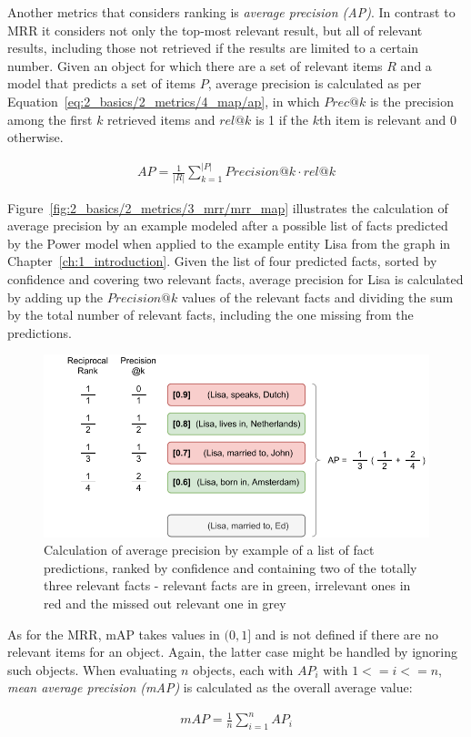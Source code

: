 Another metrics that considers ranking is \emph{average precision (AP)}. In contrast to MRR it considers not only the top-most relevant result, but all of relevant results, including those not retrieved if the results are limited to a certain number. Given an object for which there are a set of relevant items $R$ and a model that predicts a set of items $P$, average precision is calculated as per Equation~\ref{eq:2_basics/2_metrics/4_map/ap}, in which $Prec@k$ is the precision among the first $k$ retrieved items and $rel@k$ is 1 if the $k$th item is relevant and 0 otherwise.

\begin{align}
    AP = \frac{1}{|R|} \sum_{k=1}^{|P|} Precision@k \cdot rel@k
    \label{eq:2_basics/2_metrics/4_map/ap}
\end{align}

Figure~\ref{fig:2_basics/2_metrics/3_mrr/mrr_map} illustrates the calculation of average precision by an example modeled after a possible list of facts predicted by the Power model when applied to the example entity Lisa from the graph in Chapter~\ref{ch:1_introduction}. Given the list of four predicted facts, sorted by confidence and covering two relevant facts, average precision for Lisa is calculated by adding up the $Precision@k$ values of the relevant facts and dividing the sum by the total number of relevant facts, including the one missing from the predictions.

\begin{figure}[t]
    \centering
    \includegraphics{2_basics/2_metrics/4_map/mrr_map}
    \caption{Calculation of average precision by example of a list of fact predictions, ranked by confidence and containing two of the totally three relevant facts - relevant facts are in green, irrelevant ones in red and the missed out relevant one in grey}
    \label{fig:2_basics/2_metrics/4_map/mrr_map}
\end{figure}

As for the MRR, mAP takes values in $(0, 1]$ and is not defined if there are no relevant items for an object. Again, the latter case might be handled by ignoring such objects. When evaluating $n$ objects, each with $AP_i$ with $1 <= i <= n$, \emph{mean average precision (mAP)} is calculated as the overall average value:

\begin{align}
    mAP = \frac{1}{n} \sum_{i=1}^{n} AP_i
    \label{eq:2_basics/2_metrics/4_map/map}
\end{align}


